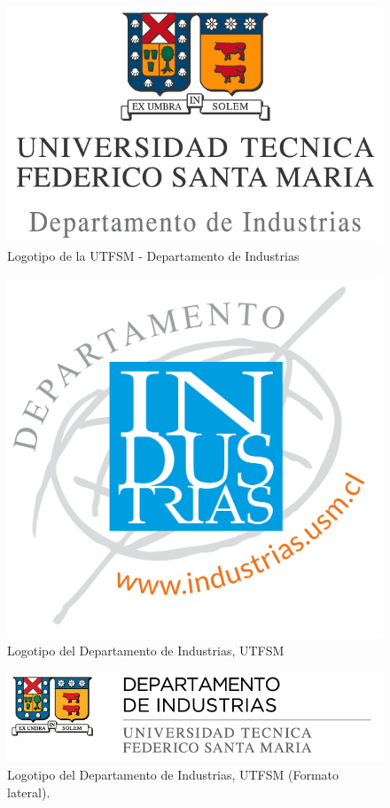 \begin{figure}[ht!]
\centering
\includegraphics[scale = .8]{figures/logousmind.jpg}
\caption{Logotipo de la UTFSM - Departamento de Industrias}
\label{fig:logousmind}
\end{figure}


\begin{figure}[ht!]
\centering
\includegraphics[width=.3\textwidth]{figures/logoind.png}
\caption{Logotipo del Departamento de Industrias, UTFSM }
\label{fig:logoind1}
\end{figure}

\begin{figure}[ht!]
\centering
\includegraphics[width=.8\textwidth]{figures/logo_utfsm_di.png}
\caption{Logotipo del Departamento de Industrias, UTFSM (Formato lateral).}
\label{fig:logodiutfsm}
\end{figure}

